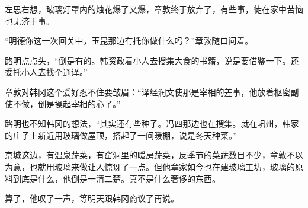 左思右想，玻璃灯罩内的烛花爆了又爆，章敦终于放弃了，有些事，徒在家中苦恼也无济于事。 

“明德你这一次回关中，玉昆那边有托你做什么吗？”章敦随口问着。 

路明点点头，“倒是有的。韩资政着小人去搜集大食的书籍，说是要借鉴一下。还委托小人去找个通译。” 

章敦对韩冈这个爱好忍不住要皱眉：“译经润文使那是宰相的差事，他放着枢密副使不做，倒是操起宰相的心了。” 

路明也不知韩冈的想法，“其实还有些种子。冯四那边也在搜集。就在巩州，韩家的庄子上新近用玻璃做屋顶，搭起了一间暖棚，说是冬天种菜。” 

京城这边，有温泉蔬菜，有窑洞里的暖房蔬菜，反季节的菜蔬数目不少，章敦不以为意，也就用玻璃来做让人惊讶了一点。但他章家如今也在建玻璃工坊，玻璃的原料到底是什么，他倒是一清二楚。真不是什么奢侈的东西。 

算了，他叹了一声，等明天跟韩冈商议了再说。 

